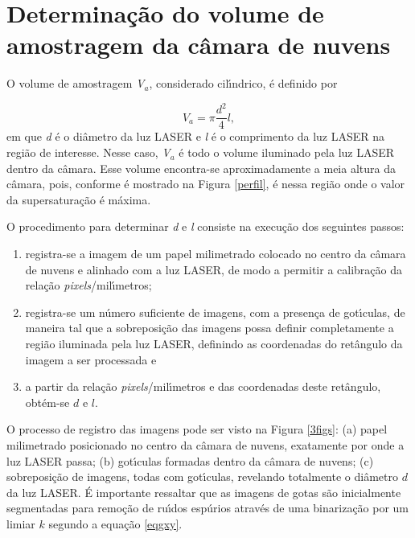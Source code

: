 \section{Determina\c{c}\~{a}o do volume de amostragem da c\^{a}mara de nuvens}
\label {detvol}

O volume de amostragem \textit{V$_{a}$}, considerado cil\'{\i}ndrico, \'{e} definido por

\begin{equation}
\label {eq3}
V_a  = \pi \frac{{d^2 }}{4}l,
\end{equation}
em que \textit{d} \'{e} o di\^{a}metro da luz LASER e \textit{l} \'{e} o comprimento da luz LASER na regi\~{a}o de interesse. Nesse caso,  \textit{V$_{a}$} \'{e} todo o volume iluminado pela luz LASER dentro da c\^{a}mara. Esse volume encontra-se aproximadamente a meia altura da c\^{a}mara, pois,  conforme \'{e} mostrado na Figura \ref{perfil}, \'{e} nessa regi\~{a}o onde o valor da supersatura\c{c}\~{a}o \'{e} m\'{a}xima.

O procedimento para determinar \textit{d} e \textit{l} consiste na execu\c{c}\~{a}o dos seguintes passos:
 \begin{enumerate} [(1)]
  \item  registra-se a imagem  de um papel milimetrado colocado no centro da c\^{a}mara de nuvens e alinhado com a luz LASER, de modo a permitir a calibra\c{c}\~{a}o da rela\c{c}\~{a}o  \emph{pixels}/mil\'{\i}metros;
  \item registra-se um n\'{u}mero suficiente de imagens, com a presen\c{c}a de got\'{\i}culas, de maneira tal que a sobreposi\c{c}\~{a}o das imagens possa definir completamente a regi\~{a}o iluminada pela luz LASER, definindo as coordenadas do ret\^{a}ngulo da imagem a ser processada e
  \item a partir da rela\c{c}\~{a}o \emph{pixels}/mil\'{\i}metros e das coordenadas deste ret\^{a}ngulo, obt\'{e}m-se $d$ e $l$.
  \end{enumerate}


O processo de registro das imagens pode ser visto na Figura \ref{3figs}: (a) papel milimetrado posicionado no centro da c\^{a}mara de nuvens, exatamente por onde a luz LASER passa; (b) got\'{\i}culas formadas dentro da c\^{a}mara de nuvens; (c) sobreposi\c{c}\~{a}o de imagens, todas com got\'{\i}culas, revelando totalmente o di\^{a}metro $d$  da luz LASER.
\'{E} importante ressaltar que as imagens de gotas s\~{a}o inicialmente segmentadas  para remo\c{c}\~{a}o de ru\'{\i}dos esp\'{u}rios atrav\'{e}s de uma binariza\c{c}\~{a}o por um limiar $k$ segundo a equa\c{c}\~{a}o \ref{eqgxy}.



